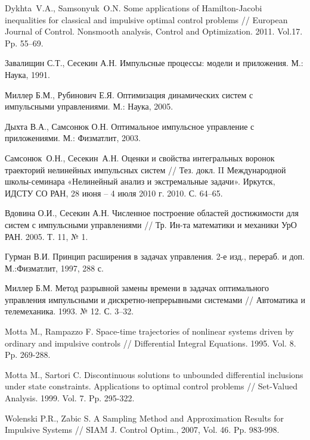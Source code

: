 \pagebreak
\begin{thebibliography}{99}

 { Dykhta~V.A., Samsonyuk~O.N.}  Some applications of
  Hamilton-Jacobi inequalities for classical and impulsive optimal
  control problems // European Journal of Control. Nonsmooth analysis,
  Control and Optimization. 2011. Vol.17. Pp. 55--69.

 { Завалищин С.Т., Сесекин А.Н.}  {Импульсные
    процессы: модели и приложения}.  М.: Наука, 1991.

 { Миллер Б.М., Рубинович Е.Я.}  { Оптимизация
    динамических систем с импульсными управлениями}.  М.: Наука, 2005.

 { Дыхта В.А., Самсонюк О.Н.}  Оптимальное импульсное
  управление с приложениями.  М.: Физматлит, 2003.

 { Самсонюк~О.Н., Сесекин~А.Н.} Оценки и свойства
  интегральных воронок траекторий нелинейных импульсных систем //
  Тез. докл. II Международной школы-семинара «Нелинейный анализ и
  экстремальные задачи». Иркутск, ИДСТУ СО РАН, 28 июня -- 4 июля 2010
  г. 2010. С. 64--65.

 Вдовина О.И., Сесекин А.Н. Численное построение
  областей достижимости для систем с импульсными управлениями //
  Тр. Ин-та математики и механики УрО РАН.  2005. Т. 11, № 1.

 Гурман В.И. Принцип расширения в задачах
  управления. 2-е изд., перераб. и доп. М.:Физматлит, 1997, 288 с.

 Миллер Б.М. Метод разрывной замены времени в задачах
  оптимального управления импульсными и дискретно-непрерывными
  системами // Автоматика и телемеханика. 1993. № 12. С. 3--32.

 Motta M., Rampazzo F. Space-time trajectories of
  nonlinear systems driven by ordinary and impulsive controls //
  Differential Integral Equations. 1995. Vol. 8.  Pp. 269-288.

 Motta M., Sartori C. Discontinuous solutions to
  unbounded differential inclusions under state constraints.
  Applications to optimal control problems // Set-Valued
  Analysis. 1999. Vol. 7. Pp. 295-322.

 Wolenski P.R., Zabic S.  A Sampling Method and
  Approximation Results for Impulsive Systems // SIAM J. Control
  Optim., 2007, Vol. 46. Pp. 983-998.


\end{thebibliography}
